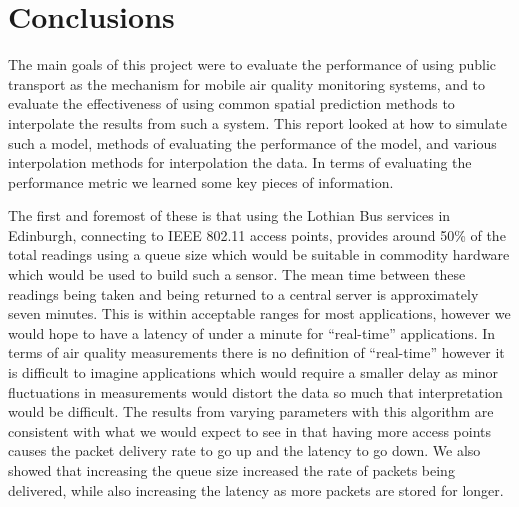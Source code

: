 \chapter{Conclusions}\label{conclusions}


The main goals of this project were to evaluate the performance of using public transport as the mechanism for mobile air quality monitoring systems, and to evaluate the effectiveness of using common spatial prediction methods to interpolate the results from such a system. This report looked at how to simulate such a model, methods of evaluating the performance of the model, and various interpolation methods for interpolation the data. In terms of evaluating the performance metric we learned some key pieces of information. 

The first and foremost of these is that using the Lothian Bus services in Edinburgh, connecting to IEEE 802.11 access points, provides around 50\% of the total readings using a queue size which would be suitable in commodity hardware which would be used to build such a sensor. The mean time between these readings being taken and being returned to a central server is approximately seven minutes. This is within acceptable ranges for most applications, however we would hope to have a latency of under a minute for ``real-time'' applications. In terms of air quality measurements there is no definition of ``real-time'' however it is difficult to imagine applications which would require a smaller delay as minor fluctuations in measurements would distort the data so much that interpretation would be difficult. The results from varying parameters with this algorithm are consistent with what we would expect to see in that having more access points causes the packet delivery rate to go up and the latency to go down. We also showed that increasing the queue size increased the rate of packets being delivered, while also increasing the latency as more packets are stored for longer. 

